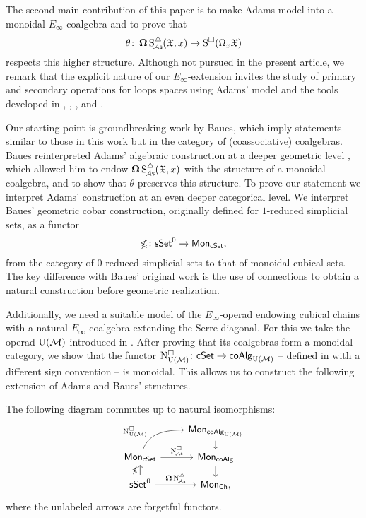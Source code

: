 The second main contribution of this paper is to make Adams model into a monoidal $E_\infty$-coalgebra and to prove that
\[
\theta \colon \operatorname{\mathbf{\Omega}} \operatorname{S^{\triangle}_{\!{\mathcal{A}\mathsf{s}}}}(\mathfrak{X}, x) \to \operatorname{S^{\square}}(\Omega_x \mathfrak{X})
\]
respects this higher structure.
Although not pursued in the present article, we remark that the explicit nature of our $E_\infty$-extension invites the study of primary and secondary operations for loops spaces using Adams' model and the tools developed in \cite{medina2021may_st}, \cite{medina2020cartan}, \cite{medina2021adem}, and \cite{medina2021comch}.

Our starting point is groundbreaking work by Baues, which imply statements similar to those in this work but in the category of (coassociative) coalgebras.
Baues reinterpreted Adams' algebraic construction at a deeper geometric level \cite{baues1998hopf}, which allowed him to endow $\operatorname{\mathbf{\Omega}} \operatorname{S^{\triangle}_{\!{\mathcal{A}\mathsf{s}}}}(\mathfrak{X}, x)$ with the structure of a monoidal coalgebra, and to show that $\theta$ preserves this structure.
To prove our statement we interpret Adams' construction at an even deeper categorical level.
We interpret Baues' geometric cobar construction, originally defined for $1$-reduced simplicial sets, as a functor
\begin{equation*}
	\operatorname{\mathbb{\Omega}} \colon \mathsf{sSet}^0 \to \mathsf{Mon}_{\mathsf{cSet}},
\end{equation*}
from the category of $0$-reduced simplicial sets to that of monoidal cubical sets.
The key difference with Baues' original work is the use of connections to obtain a natural construction before geometric realization.

Additionally, we need a suitable model of the $E_\infty$-operad endowing cubical chains with a natural $E_\infty$-coalgebra extending the Serre diagonal.
For this we take the operad ${\operatorname{U}(\mathcal{M})}$ introduced in \cite{medina2020prop1}.
After proving that its coalgebras form a monoidal category, we show that the functor $\operatorname{N^{\square}_{{\operatorname{U}(\mathcal{M})}}} \colon \mathsf{cSet} \to \mathsf{coAlg}_{\operatorname{U}(\mathcal{M})}$ -- defined in \cite{medina2022cube_einfty} with a different sign convention -- is monoidal.
This allows us to construct the following extension of Adams and Baues' structures.

\begin{theorem*}
	The following diagram commutes up to natural isomorphisms:
	\[
	\begin{tikzcd} [row sep=small]
		& \Mon_{\coAlg_\UM} \arrow[d] \\
		\Mon_{\cSet} \arrow[ru, "\cchainsUM", out=70, in=180, near start] \arrow[r, "\cchainsA"]
		& \Mon_{\coAlg} \arrow[d] \\
		\sSet^0 \arrow[r, "\cobar \schainsA"] \arrow[u, "\ccobar"]
		& \Mon_{\Ch},
	\end{tikzcd}
	\]
	where the unlabeled arrows are forgetful functors.
\end{theorem*}

